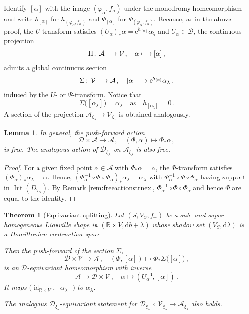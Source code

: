 \documentclass{amsart}
\newtheorem{thm}[prop]{Theorem}
\newtheorem{lem}[prop]{Lemma}
\theoremstyle{definition}
\def\co{\colon\thinspace}
\newcommand{\AAA}{\mathcal A}
\newcommand{\rmd}{\mathrm d}
\newcommand{\DD}{\mathcal D}
\newcommand{\rme}{\mathrm e}
\newcommand{\R}{\mathbb R}
\newcommand{\VV}{\mathcal V}
\newcommand{\lra}{\longrightarrow}
\newcommand{\ra}{\rightarrow}
\DeclareMathOperator{\id}{\mathrm{id}}
\DeclareMathOperator{\Int}{\mathrm{Int}}
\begin{document}
Identify $[\alpha]$ with the image
$(\varphi_{\alpha},f_{\alpha})$
under the monodromy homeomorphism
and write $h_{[\alpha]}$
for $h_{(\varphi_{\alpha},f_{\alpha})}$
and $\Psi_{[\alpha]}$
for $\Psi_{(\varphi_{\alpha},f_{\alpha})}$.
Because, as in the above proof,
the $U$-transform satisfies
$(U_{\alpha})_*\alpha=\rme^{h_{[\alpha]}}\alpha_{\lambda}$
and $U_{\alpha}\in\DD$,
the continuous projection
  \[
  \Pi\co
  \AAA\lra\VV
  \,,
  \quad
  \alpha\longmapsto[\alpha]
  \,,
  \]
admits a global continuous section
  \[
  \Sigma\co
  \VV\lra\AAA
  \,,
  \quad
  [\alpha]\longmapsto
  \rme^{h_{[\alpha]}}\alpha_{\lambda}
  \,,
  \]
induced by the $U$- or $\Psi$-transform.
Notice that
\[
\Sigma\big([\alpha_{\lambda}]\big)=\alpha_{\lambda}
\quad\text{as}\quad
h_{[\alpha_{\lambda}]}=0
\,.
\]
A section of the projection
$\AAA_{\xi_{\lambda}}\!\ra\VV_{\xi_{\lambda}}\!$ 
is obtained analogously.


\begin{lem}
\label{lem:freeaction}
In general,
the push-forward action
  \[
  \DD\times\AAA\lra\AAA
  \,,
  \quad
  (\Phi,\alpha)\longmapsto\Phi_*\alpha
  \,,
  \]
is free.
The analogous action of $\DD_{\xi_{\lambda}}\!$
on $\AAA_{\xi_{\lambda}}\!$ is also free.
\end{lem}


\begin{proof}
For a given fixed point $\alpha\in\AAA$
with $\Phi_*\alpha=\alpha$,
the $\Phi$-transform satisfies
$(\Phi_{\alpha})_*\alpha_{\lambda}=\alpha$.
Hence,
$(\Phi_{\alpha}^{-1}\circ\Phi\circ\Phi_{\alpha})_*\alpha_{\lambda}
=\alpha_{\lambda}$
with $\Phi_{\alpha}^{-1}\circ\Phi\circ\Phi_{\alpha}$
having support in $\Int(D_{T_{\alpha}})$.
By Remark \ref{rem:freeactionstrnex},
$\Phi_{\alpha}^{-1}\circ\Phi\circ\Phi_{\alpha}$
and hence $\Phi$ are equal to the identity.
\end{proof}


\begin{thm}[Equivariant splitting]
\label{thm:splitting}
Let $(S,V_S,f_{\pm})$
be a sub- and super-homo\-geneous Liouville shape
in $(\R\times V,\rmd b+\lambda)$
whose shadow set $(V_S,\rmd\lambda)$
is a Hamiltonian contraction space.

Then the push-forward of the section $\Sigma$,
\[
  \DD\times\VV\lra\AAA
  \,,
  \quad
  (\Phi,[\alpha])\longmapsto
  \Phi_*\Sigma\big([\alpha]\big)
  \,,
\]
is an $\DD$-equivariant homeomorphism
with inverse
\[
  \AAA\lra\DD\times\VV
  \,,
  \quad
  \alpha\longmapsto
  (U_{\alpha}^{-1},[\alpha])
  \,.
\]
It maps
$\big(\!\id_{\R\times V},[\alpha_{\lambda}]\big)$
to $\alpha_{\lambda}$.

  The analogous $\DD_{\xi_{\lambda}}$-equivariant
  statement for
  $\DD_{\xi_{\lambda}}\!\times\VV_{\xi_{\lambda}}
  \ra\AAA_{\xi_{\lambda}}\!$ also holds.
\end{thm}
\end{document}
